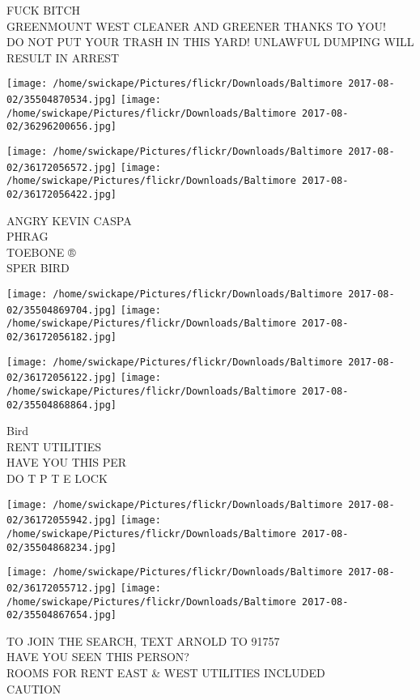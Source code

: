 \documentclass[10pt,letterpaper]{article}
\begin{document}
FUCK BITCH\\
GREENMOUNT WEST CLEANER AND GREENER THANKS TO YOU!\\
DO NOT PUT YOUR TRASH IN THIS YARD!  UNLAWFUL DUMPING WILL RESULT IN ARREST
\pagebreak

\texttt{[image: /home/swickape/Pictures/flickr/Downloads/Baltimore 2017-08-02/35504870534.jpg]}
\texttt{[image: /home/swickape/Pictures/flickr/Downloads/Baltimore 2017-08-02/36296200656.jpg]}

\texttt{[image: /home/swickape/Pictures/flickr/Downloads/Baltimore 2017-08-02/36172056572.jpg]}
\texttt{[image: /home/swickape/Pictures/flickr/Downloads/Baltimore 2017-08-02/36172056422.jpg]}

ANGRY KEVIN CASPA\\
PHRAG\\
TOEBONE ®\\
SPER BIRD
\pagebreak

\texttt{[image: /home/swickape/Pictures/flickr/Downloads/Baltimore 2017-08-02/35504869704.jpg]}
\texttt{[image: /home/swickape/Pictures/flickr/Downloads/Baltimore 2017-08-02/36172056182.jpg]}

\texttt{[image: /home/swickape/Pictures/flickr/Downloads/Baltimore 2017-08-02/36172056122.jpg]}
\texttt{[image: /home/swickape/Pictures/flickr/Downloads/Baltimore 2017-08-02/35504868864.jpg]}

Bird\\
RENT UTILITIES\\
HAVE YOU THIS PER\\
DO T P T E LOCK
\pagebreak

\texttt{[image: /home/swickape/Pictures/flickr/Downloads/Baltimore 2017-08-02/36172055942.jpg]}
\texttt{[image: /home/swickape/Pictures/flickr/Downloads/Baltimore 2017-08-02/35504868234.jpg]}

\texttt{[image: /home/swickape/Pictures/flickr/Downloads/Baltimore 2017-08-02/36172055712.jpg]}
\texttt{[image: /home/swickape/Pictures/flickr/Downloads/Baltimore 2017-08-02/35504867654.jpg]}

TO JOIN THE SEARCH, TEXT ARNOLD TO 91757\\
HAVE YOU SEEN THIS PERSON?\\
ROOMS FOR RENT EAST \& WEST UTILITIES INCLUDED\\
CAUTION
\pagebreak
\end{document}
